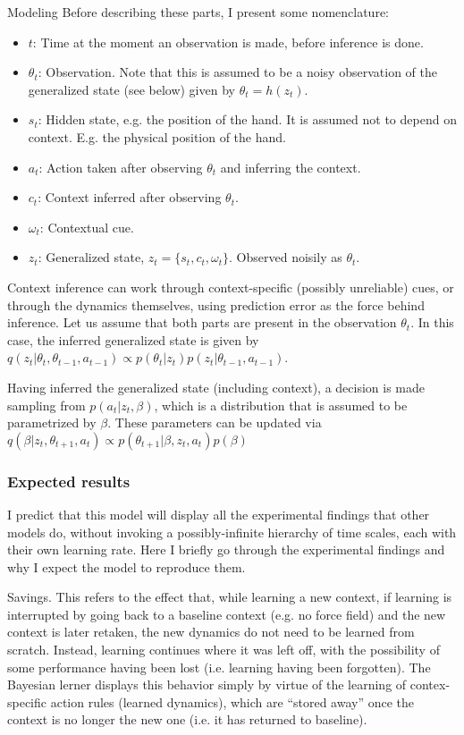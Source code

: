 \documentclass{report}
\begin{document}
\begin{chapter}{Modeling}
Before describing these parts, I present some nomenclature:
\begin{itemize}
\item $t$: Time at the moment an observation is made, before inference is done.
\item $\theta_t$: Observation. Note that this is assumed to be a noisy
observation of the generalized state (see below) given by $\theta_t = h(z_t)$.
\item $s_t$: Hidden state, e.g. the position of the hand. It is assumed not to
depend on context. E.g. the physical position of the hand.
\item $a_t$: Action taken after observing $\theta_t$ and inferring the context.
\item $c_t$: Context inferred after observing $\theta_t$.
\item $\omega_t$: Contextual cue.
\item $z_t$: Generalized state, $z_t = \{s_t, c_t, \omega_t\}$. Observed noisily
as $\theta_t$.
\end{itemize}

Context inference can work through context-specific (possibly unreliable) cues,
or through the dynamics themselves, using prediction error as the force behind
inference. Let us assume that both parts are present in the observation
$\theta_t$. In this case, the inferred generalized state is given by
$q(z_t | \theta_t, \theta_{t-1}, a_{t-1}) \propto p(\theta_t |
z_t)p(z_t|\theta_{t-1}, a_{t-1})$.

Having inferred the generalized state (including context), a decision is made
sampling from $p(a_t | z_t, \beta)$, which is a distribution that is assumed to
be parametrized by $\beta$. These parameters can be updated via
$q(\beta | z_t, \theta_{t+1}, a_t) \propto p(\theta_{t+1} | \beta, z_t,
a_t)p(\beta)$

\subsubsection{Expected results}
I predict that this model will display all the experimental findings that other
models do, without invoking a possibly-infinite hierarchy of time scales, each
with their own learning rate. Here I briefly go through the experimental
findings and why I expect the model to reproduce them.

Savings. This refers to the effect that, while learning a new context, if
learning is interrupted by going back to a baseline context (e.g. no force
field) and the new context is later retaken, the new dynamics do not need to be
learned from scratch. Instead, learning continues where it was left off, with
the possibility of some performance having been lost (i.e. learning having been
forgotten). The Bayesian lerner displays this behavior simply by virtue of the
learning of contex-specific action rules (learned dynamics), which are ``stored
away'' once the context is no longer the new one (i.e. it has returned to
baseline).


\end{chapter}
\end{document}
